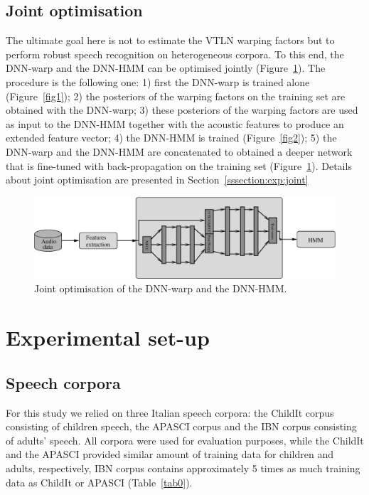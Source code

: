 \documentclass{nle}
\begin{document}
\subsection{Joint optimisation}
The ultimate goal here is not to estimate the VTLN warping factors but to perform robust speech recognition on heterogeneous corpora. To this end, the DNN-warp and the DNN-HMM can be optimised jointly (Figure~\ref{fig3}). The procedure is the following one: 1) first the DNN-warp is trained alone (Figure~\ref{fig1}); 2) the posteriors of the warping factors on the training set are obtained with the DNN-warp; 3) these posteriors of the warping factors are used as input to the DNN-HMM together with the acoustic features to produce an extended feature vector; 4) the DNN-HMM is trained (Figure~\ref{fig2}); 5)  the DNN-warp and the DNN-HMM are concatenated to obtained a deeper network that is fine-tuned with back-propagation on the training set (Figure~\ref{fig3}). Details about joint optimisation are presented in Section~\ref{sssection:exp:joint}

  \begin{figure}
       \includegraphics[width=\textwidth]{fig3}
          \caption{Joint optimisation of the DNN-warp and the DNN-HMM.} 
     	\label{fig3}
  \end{figure}

\section{Experimental set-up}\label{section:expS}
\subsection{Speech corpora}

For  this study  we  relied  on three  Italian  speech corpora:  the
ChildIt corpus  consisting of children speech,  the APASCI corpus and the IBN corpus consisting of  
adults'  speech.    All  corpora  were  used  for
evaluation purposes, while the ChildIt and the APASCI provided similar
amount of training data for children and adults, respectively, IBN corpus contains  approximately 5 times as much training data as ChildIt or APASCI (Table~\ref{tab0}).
\end{document}
